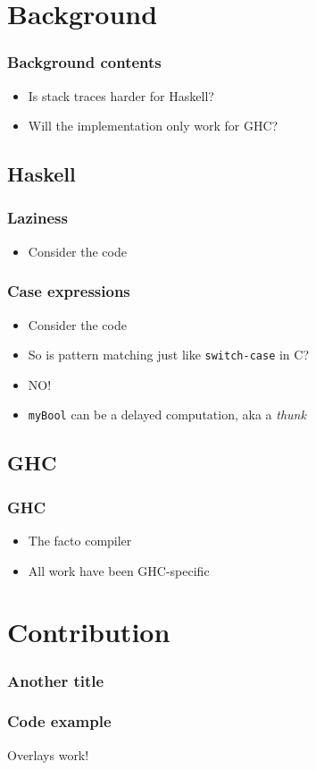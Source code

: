 \documentclass[11pt]{beamer} %
\begin{document}
\section{Background}

  \begin{frame}
   \frametitle{Background contents}
  \begin{itemize}
   \item Is stack traces harder for Haskell?
   \item Will the implementation only work for GHC?
  \end{itemize}
  \end{frame}


\subsection{Haskell}

  \begin{frame}
   \frametitle{Laziness}
  \begin{itemize}
   \item Consider the code
     \lazyCode
  \end{itemize}
  \end{frame}

  \begin{frame}
   \frametitle{Case expressions}
  \begin{itemize}
   \item <1-> Consider the code
     \caseCode
   \item <1-> So is pattern matching just like \texttt{switch-case} in C?
   \item <2-> NO!
   \item <3-> \texttt{myBool} can be a delayed computation, aka a \emph{thunk}
  \end{itemize}
  \end{frame}

\subsection{GHC}
  \begin{frame}
   \frametitle{GHC}
  \begin{itemize}
   \item The facto compiler
   \item All work have been GHC-specific
  \end{itemize}
  \end{frame}


\section{Contribution}
\begin{frame}
 \frametitle{Another title}
\end{frame}

\begin{frame}
\frametitle{Code example}
\exampleCode
\pause
Overlays work!
\end{frame}
\end{document}
